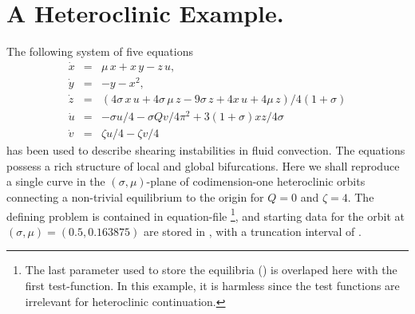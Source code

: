 \documentclass[12pt]{report}
\begin{document}
\section{ A Heteroclinic Example.}
The following system of five equations 
\begin{equation} \label{sh1} \begin{array}{rcl}
\dot{x} & = & \mu \, x + x\, y - z\, u, \\
\dot{y} & = & -y - x^2, \\
\dot{z} & = & (4\sigma\, x\, u + 4\sigma\, \mu\, z -9\sigma\, z 
+ 4 x\, u + 4\mu\, z) / 4(1+\sigma)  \\
\dot{u} & = & - \sigma u / 4 - \sigma Q v / 4\pi^2
+ 3(1 + \sigma) x z / 4\sigma \\
\dot{v} & = & \zeta u / 4  - \zeta v / 4
\end{array} 
\end{equation}
has been used to describe shearing instabilities in fluid convection.
The equations possess a rich structure of local and global bifurcations.
Here we shall reproduce a single curve in the $(\sigma,\mu)$-plane
of codimension-one heteroclinic orbits connecting a non-trivial 
equilibrium to the origin for $Q=0$ and $\zeta=4$. The defining
problem is contained in equation-file 
\footnote{The last parameter used to store the equilibria () is
overlaped here with the first test-function. In this example, it is harmless since the test functions are 
irrelevant for heteroclinic continuation.}, and starting data for the orbit at 
$(\sigma,\mu)=(0.5,0.163875)$ are stored in ,
with a truncation interval of .
\end{document}
